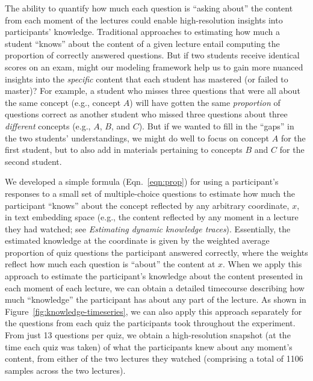 \documentclass[10pt]{article}
\begin{document}
The ability to quantify how much each question is ``asking about'' the content
from each moment of the lectures could enable high-resolution insights into
participants' knowledge. Traditional approaches to estimating how much a
student ``knows'' about the content of a given lecture entail computing the
proportion of correctly answered questions. But if two students receive
identical scores on an exam, might our modeling framework help us to gain more
nuanced insights into the \textit{specific} content that each student has
mastered (or failed to master)? For example, a student who misses three
questions that were all about the same concept (e.g., concept $A$) will have
gotten the same \textit{proportion} of questions correct as another student who
missed three questions about three \textit{different} concepts (e.g., $A$, $B$,
and $C$). But if we wanted to fill in the ``gaps'' in the two students'
understandings, we might do well to focus on concept $A$ for the first student,
but to also add in materials pertaining to concepts $B$ and $C$ for the second
student.

We developed a simple formula (Eqn.~\ref{eqn:prop}) for using a participant's
responses to a small set of multiple-choice questions to estimate how much the
participant ``knows'' about the concept reflected by any arbitrary coordinate,
$x$, in text embedding space (e.g., the content reflected by any moment in a
lecture they had watched; see \textit{Estimating dynamic knowledge traces}).
Essentially, the estimated knowledge at the coordinate is given by the weighted
average proportion of quiz questions the participant answered correctly, where
the weights reflect how much each question is ``about'' the content at $x$.
When we apply this approach to estimate the participant's knowledge about the
content presented in each moment of each lecture, we can obtain a detailed
timecourse describing how much ``knowledge'' the participant has about any part
of the lecture. As shown in Figure~\ref{fig:knowledge-timeseries}, we can also
apply this approach separately for the questions from each quiz the
participants took throughout the experiment. From just 13 questions per quiz,
we obtain a high-resolution snapshot (at the time each quiz was taken) of what
the participants knew about any moment's content, from either of the two
lectures they watched (comprising a total of 1106 samples across the two
lectures).
\end{document}
